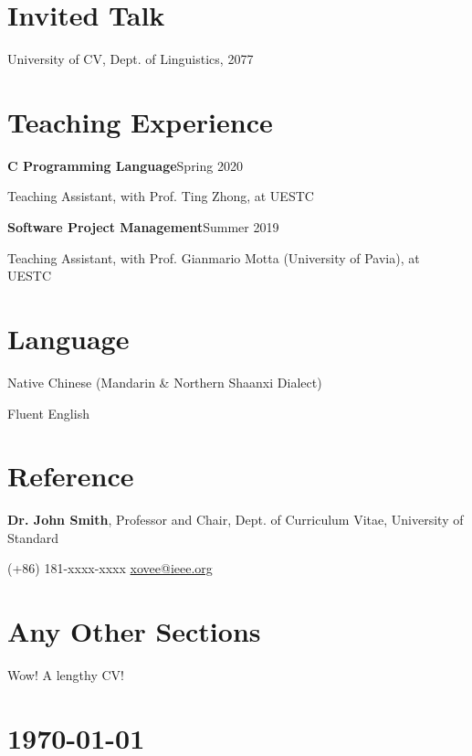\documentclass{article}
\newcommand{\cvsection}[1]{\section*{\rmfamily#1}}
\begin{document}





\cvsection{Invited Talk}
\indent 

University of CV, Dept. of Linguistics, 2077 



\cvsection{Teaching Experience}
\indent

\textbf{C Programming Language}\hfill Spring 2020

\hspace{2em}Teaching Assistant, with Prof. Ting Zhong, at UESTC

\textbf{Software Project Management}\hfill Summer 2019

\hspace{2em}Teaching Assistant, with Prof. Gianmario Motta (University of Pavia), at UESTC














\cvsection{Language}
\indent

Native Chinese (Mandarin \& Northern Shaanxi Dialect)

Fluent English




\cvsection{Reference}
\indent

\textbf{Dr. John Smith}, Professor and Chair, Dept. of Curriculum Vitae, University of Standard

\hspace{2em}(+86) 181-xxxx-xxxx \hspace{2em} \url{xovee@ieee.org}


\cvsection{Any Other Sections}
\indent 

Wow! A lengthy CV!


\vfill

\section*{\hfill\color{OliveGreen}\today}
\end{document}
